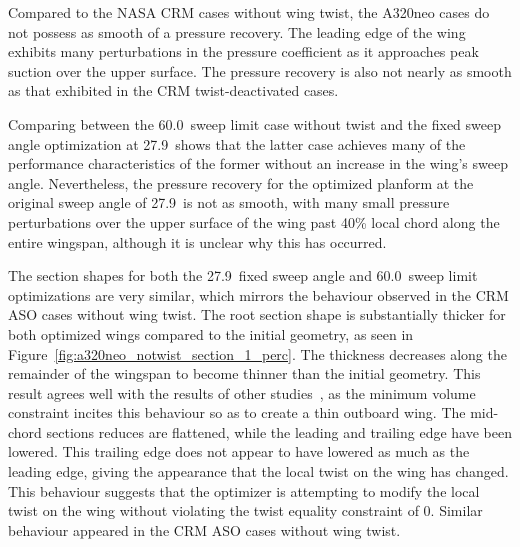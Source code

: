 Compared to the NASA CRM cases without wing twist, the A320neo cases do not possess as smooth of a pressure recovery. The leading edge of the wing exhibits many perturbations in the pressure coefficient as it approaches peak suction over the upper surface. The pressure recovery is also not nearly as smooth as that exhibited in the CRM twist-deactivated cases.

Comparing between the 60.0\degree\ sweep limit case without twist and the fixed sweep angle optimization at 27.9\degree\ shows that the latter case achieves many of the performance characteristics of the former without an increase in the wing's sweep angle. Nevertheless, the pressure recovery for the optimized planform at the original sweep angle of 27.9\degree\ is not as smooth, with many small pressure perturbations over the upper surface of the wing past 40\% local chord along the entire wingspan, although it is unclear why this has occurred.

The section shapes for both the 27.9\degree\ fixed sweep angle and 60.0\degree\ sweep limit optimizations are very similar, which mirrors the behaviour observed in the CRM ASO cases without wing twist. The root section shape is substantially thicker for both optimized wings compared to the initial geometry, as seen in Figure~\ref{fig:a320neo_notwist_section_1_perc}. The thickness decreases along the remainder of the wingspan to become thinner than the initial geometry. This result agrees well with the results of other studies~\cite{ledoux_study_2015, kenway_multipoint_2015, telidetzki_application_2014, lyu_rans-based_2014, lyu_aerodynamic_2015, osusky_drag_2015, shi-dong_approximate_2018, yu_influence_2018, koo_investigation_2018}, as the minimum volume constraint incites this behaviour so as to create a thin outboard wing. 
The mid-chord sections reduces are flattened, while the leading and trailing edge have been lowered. This trailing edge does not appear to have lowered as much as the leading edge, giving the appearance that the local twist on the wing has changed. This behaviour suggests that the optimizer is attempting to modify the local twist on the wing without violating the twist equality constraint of 0\degree. Similar behaviour appeared in the CRM ASO cases without wing twist.


